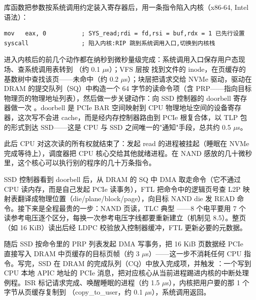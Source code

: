 
 库函数把参数按系统调用约定装入寄存器后，用一条指令陷入内核（x86-64, Intel 语法）：

\begin{lstlisting}
mov   eax, 0          ; SYS_read;rdi = fd,rsi = buf,rdx = 1 已先行设置
syscall               ; 陷入内核:RIP 跳到系统调用入口,切换到内核栈
\end{lstlisting}

进入内核后的前几个动作都在纳秒到微秒量级完成：系统调用入口保存用户态现场、查系统调用表转到 （约 0.1 $\mu$s）；VFS 层按  找到文件的 inode，在页缓存的基数树中查找该页——未命中（约 0.2 $\mu$s）；块层把请求交给 NVMe 驱动，驱动在 DRAM 的提交队列（SQ）中构造一个 64 字节的读命令项（含 PRP——指向目标物理页的物理地址列表），然后做一步关键动作：向 SSD 控制器的 doorbell 寄存器做一次 。doorbell 是 PCIe BAR 空间映射到 CPU 物理地址空间的设备寄存器，这次写不会进 cache，而是经内存控制器路由到 PCIe 根复合体，以 TLP 包的形式到达 SSD——这是 CPU 与 SSD 之间唯一的"通知"手段，总共约 0.5 $\mu$s。

此后 CPU 对这次读的所有权就结束了：发起 read 的进程被挂起（睡眠在 NVMe 完成等待上），调度器把 CPU 核心交给其他就绪进程。在 NAND 感放的几十微秒里，这个核心可以执行别的程序的几十万条指令。


SSD 控制器看到 doorbell 后，从 DRAM 的 SQ 中 DMA 取走命令（它不通过 CPU 读内存，而是自己发起 PCIe 读事务），FTL 把命令中的逻辑页号查 L2P 映射表翻译成物理位置（die/plane/block/page），向目标 NAND die 发 READ 命令。接下来是全程最贵的一步：NAND 页读，TLC 典型 ——8 个电平要用 7 个读参考电压逐个区分，每换一次参考电压字线都要重新建立（机制见 8.5）。整页（如 16 KiB）读出后经 LDPC 校验放入控制器缓冲，FTL 更新必要的元数据。

随后 SSD 按命令里的 PRP 列表发起 DMA 写事务，把 16 KiB 页数据经 PCIe 直接写入 DRAM 中页缓存的目标页帧（约 3 $\mu$s）——这一步不消耗任何 CPU 指令。写完，SSD 在 DRAM 的完成队列（CQ）中放入完成项，并触发 ：一个写到 CPU 本地 APIC 地址的 PCIe 消息，把对应核心从当前进程踢进内核的中断处理例程。ISR 标记请求完成、唤醒睡眠的进程（约 1.5 $\mu$s），内核把用户要的那 1 个字节从页缓存复制到 （copy\_to\_user，约 0.1 $\mu$s），系统调用返回。


